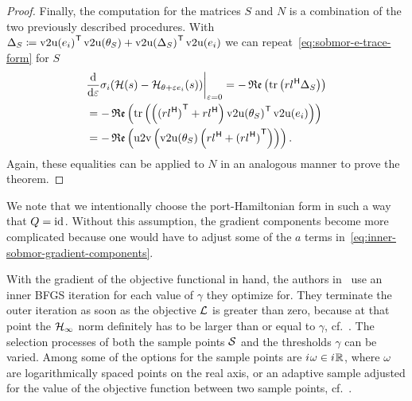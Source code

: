 \begin{proof}
    Finally, the computation for the matrices $S$ and $N$ is a combination of the two previously described procedures.
    With $\Delta_S \coloneqq {\mathop{}\!\mathrm{v}2\mathrm{u}(e_i)}^{\mkern1mu \mathsf{T}} \mathop{}\!\mathrm{v}2\mathrm{u}(\theta_S) + {\mathop{}\!\mathrm{v}2\mathrm{u}(\Delta_S)}^{\mkern1mu \mathsf{T}} \mathop{}\!\mathrm{v}2\mathrm{u}(e_i)$ we can repeat~\eqref{eq:sobmor-e-trace-form} for $S$
    \begin{equation*}
        \begin{aligned}
            &\res{\frac{\dif}{\dif \varepsilon} \sigma_i(\mcl{H}(s) - \mcl{H}_{\theta + \varepsilon e_i}(s))}{\varepsilon = 0} = - \re{\trace{r l\herm \Delta_S}} \\
             &= - \re{\trace{\left( {(r l\herm)}\trans + r l\herm \right) {\vecupper(\theta_S)}\trans \vecupper(e_i)}} \\
             &= - \re{\uppervec\left( \vecupper(\theta_S) \left( r l\herm + {(r l\herm)}\trans \right) \right)}.
        \end{aligned}
    \end{equation*}
    Again, these equalities can be applied to $N$ in an analogous manner to prove the theorem.

\end{proof}

\begin{remark}
    We note that we intentionally choose the port-Hamiltonian form in such a way that $Q = \text{id}_{}$.
    Without this assumption, the gradient components become more complicated because one would have to adjust some of the $a$ terms in~\eqref{eq:inner-sobmor-gradient-components}.
\end{remark}

With the gradient of the objective functional in hand, the authors in~\cite{Schwerdtner2023} use an inner BFGS iteration for each value of $\gamma$ they optimize for.
They terminate the outer iteration as soon as the objective $\mathcal{L}$ is greater than zero, because at that point the $\mathcal{H}_\infty$ norm definitely has to be larger than or equal to $\gamma$, cf.~\cite[Section~3.2.2]{Schwerdtner2023}.
The selection processes of both the sample points $\mathcal{S}$ and the thresholds $\gamma$ can be varied.
Among some of the options for the sample points are ${i\mkern1mu} \omega \in {i\mkern1mu} \mathbb{R}$, where $\omega$ are logarithmically spaced points on the real axis, or an adaptive sample adjusted for the value of the objective function between two sample points, cf.~\cite{SV2021}.


